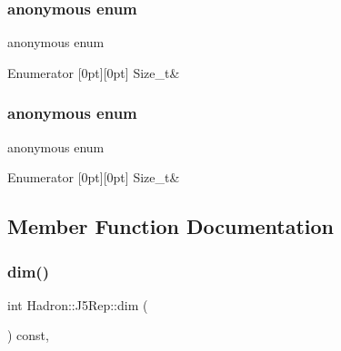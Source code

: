 \subsubsection{\texorpdfstring{anonymous enum}{anonymous enum}}
{\footnotesize\ttfamily anonymous enum}

\begin{DoxyEnumFields}{Enumerator}
[0pt][0pt]{}\mbox{\label{structHadron_1_1J5Rep_a0e20d7ac8184129af6606e00fdc7e96ba114ac1ed2dab800e721cda73a81aba18}} 
Size\+\_\+t&\\
\hline

\end{DoxyEnumFields}
\mbox{\label{structHadron_1_1J5Rep_af8f7dc132fd3969b8e6be2dabfab8c47}} 
\subsubsection{\texorpdfstring{anonymous enum}{anonymous enum}}
{\footnotesize\ttfamily anonymous enum}

\begin{DoxyEnumFields}{Enumerator}
[0pt][0pt]{}\mbox{\label{structHadron_1_1J5Rep_a0e20d7ac8184129af6606e00fdc7e96ba114ac1ed2dab800e721cda73a81aba18}} 
Size\+\_\+t&\\
\hline

\end{DoxyEnumFields}


\subsection{Member Function Documentation}
\mbox{\label{structHadron_1_1J5Rep_a3ae25f39e16107e667d4a57293cea52b}} 
\subsubsection{\texorpdfstring{dim()}{dim()}\hspace{0.1cm}{\footnotesize\ttfamily [1/3]}}
{\footnotesize\ttfamily int Hadron\+::\+J5\+Rep\+::dim (\begin{DoxyParamCaption}{ }\end{DoxyParamCaption}) const\hspace{0.3cm}{\ttfamily [inline]}, {\ttfamily [virtual]}}



